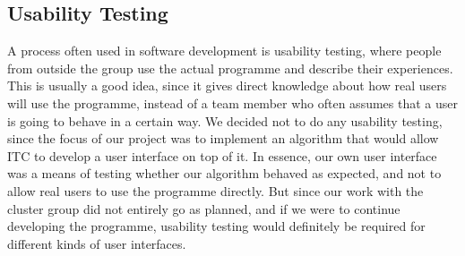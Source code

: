 \subsection*{Usability Testing}
A process often used in software development is usability testing, where people from outside the group use the actual programme and describe their experiences.
This is usually a good idea, since it gives direct knowledge about how real users will use the programme, instead of a team member who often assumes that a user is going to behave in a certain way.
We decided not to do any usability testing, since the focus of our project was to implement an algorithm that would allow ITC to develop a user interface on top of it.
In essence, our own user interface was a means of testing whether our algorithm behaved as expected, and not to allow real users to use the programme directly.
But since our work with the cluster group did not entirely go as planned, and if we were to continue developing the programme, usability testing would definitely be required for different kinds of user interfaces.
